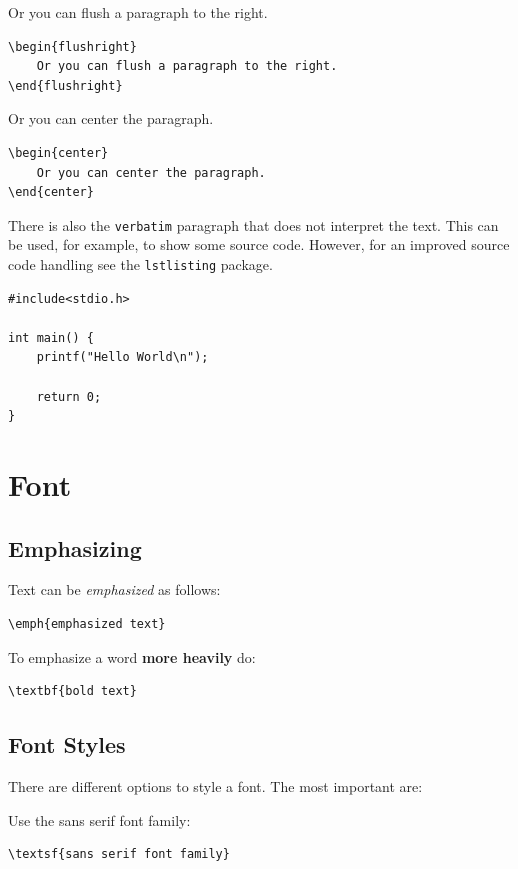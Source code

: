 \begin{flushright}
    Or you can flush a paragraph to the right.
\end{flushright}
\begin{verbatim}
\begin{flushright}
    Or you can flush a paragraph to the right.
\end{flushright}
\end{verbatim}

\begin{center}
    Or you can center the paragraph.
\end{center}
\begin{verbatim}
\begin{center}
    Or you can center the paragraph.
\end{center}
\end{verbatim}

There is also the \texttt{verbatim} paragraph that does not interpret the text. This can be used, for example, to show some source code. However, for an improved source code handling see the \texttt{lstlisting} package.
\begin{verbatim}
#include<stdio.h>

int main() {
    printf("Hello World\n");

    return 0;
}
\end{verbatim}

\section{Font}

\subsection{Emphasizing}
Text can be \emph{emphasized} as follows:
\begin{verbatim}
\emph{emphasized text}
\end{verbatim}

To emphasize a word \textbf{more heavily} do:
\begin{verbatim}
\textbf{bold text}
\end{verbatim}

\subsection{Font Styles}
There are different options to style a font. The most important are:

Use the \textsf{sans serif font family}:
\begin{verbatim}
\textsf{sans serif font family}
\end{verbatim}

